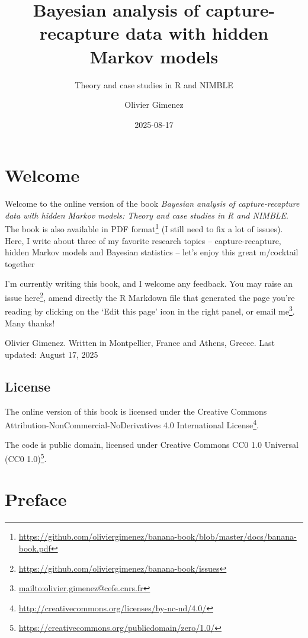 \documentclass[
  12pt,
]{krantz}
\title{Bayesian analysis of capture-recapture data with hidden Markov models}
\subtitle{Theory and case studies in R and NIMBLE}
\author{Olivier Gimenez}
\date{2025-08-17}
\renewcommand{\href}[2]{#2\footnote{\url{#1}}}
\begin{document}
\maketitle

\thispagestyle{empty}

\setlength{\abovedisplayskip}{-5pt}
\setlength{\abovedisplayshortskip}{-5pt}

{
\hypersetup{linkcolor=}
\setcounter{tocdepth}{2}
\tableofcontents
}
\listoffigures
\listoftables
\chapter*{Welcome}\label{welcome}


Welcome to the online version of the book \emph{Bayesian analysis of capture-recapture data with hidden Markov models: Theory and case studies in R and NIMBLE}. The book is also available in \href{https://github.com/oliviergimenez/banana-book/blob/master/docs/banana-book.pdf}{PDF format} (I still need to fix a lot of issues). Here, I write about three of my favorite research topics -- capture-recapture, hidden Markov models and Bayesian statistics -- let's enjoy this great m/cocktail together 🍹

I'm currently writing this book, and I welcome any feedback. You may raise an issue \href{https://github.com/oliviergimenez/banana-book/issues}{here}, amend directly the R Markdown file that generated the page you're reading by clicking on the `Edit this page' icon in the right panel, or \href{mailto:olivier.gimenez@cefe.cnrs.fr}{email me}. Many thanks!

Olivier Gimenez. Written in Montpellier, France and Athens, Greece.
Last updated: August 17, 2025

\section*{License}\label{license}


The online version of this book is licensed under the \href{http://creativecommons.org/licenses/by-nc-nd/4.0/}{Creative Commons Attribution-NonCommercial-NoDerivatives 4.0 International License}.

The code is public domain, licensed under \href{https://creativecommons.org/publicdomain/zero/1.0/}{Creative Commons CC0 1.0 Universal (CC0 1.0)}.

\chapter*{Preface}\label{preface}
\end{document}
